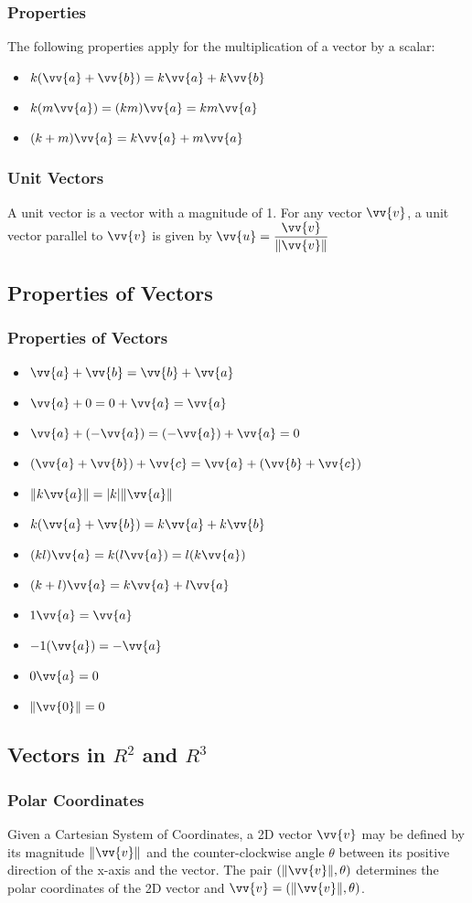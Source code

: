 \documentclass{article}
\newcommand{\mv}[1]{
	\lVert\vv{#1}\rVert
}
\begin{document}
	\subsubsection{Properties}
	The following properties apply for the multiplication of a vector by a scalar:
	\begin{itemize}
		\item $k(\vv{a}+\vv{b})=k\vv{a}+k\vv{b}$
		\item $k(m\vv{a})=(km)\vv{a}=km\vv{a}$
		\item $(k+m)\vv{a}=k\vv{a}+m\vv{a}$
	\end{itemize}
	\subsubsection{Unit Vectors}
	A unit vector is a vector with a magnitude of 1. For any vector $\vv{v}$, a unit vector parallel to $\vv{v}$ is given by $\vv{u}=\dfrac{\vv{v}}{\mv{v}}$
	\subsection{Properties of Vectors}
	\subsubsection{Properties of Vectors}
	\begin{itemize}
		\item $\vv{a}+\vv{b}=\vv{b}+\vv{a}$
		\item $\vv{a}+0=0+\vv{a}=\vv{a}$
		\item $\vv{a}+(-\vv{a})=(-\vv{a})+\vv{a}=0$
		\item $(\vv{a}+\vv{b})+\vv{c}=\vv{a}+(\vv{b}+\vv{c})$
		\item $\lVert k\vv{a}\rVert=|k|\mv{a}$
		\item $k(\vv{a}+\vv{b})=k\vv{a}+k\vv{b}$
		\item $(kl)\vv{a}=k(l\vv{a})=l(k\vv{a})$
		\item $(k+l)\vv{a}=k\vv{a}+l\vv{a}$
		\item $1\vv{a}=\vv{a}$
		\item $-1(\vv{a})=-\vv{a}$
		\item $0\vv{a}=0$
		\item $\mv{0}=0$
	\end{itemize}
	\subsection{Vectors in $R^2$ and $R^3$}
	\subsubsection{Polar Coordinates}
	Given a Cartesian System of Coordinates, a 2D vector $\vv{v}$ may be defined by its magnitude $\mv{v}$ and the counter-clockwise angle $\theta$ between its positive direction of the x-axis and the vector.
	The pair $(\lVert\vv{v}\rVert, \theta)$ determines the polar coordinates of the 2D vector and $\vv{v}=(\lVert\vv{v}\rVert, \theta)$.
\end{document}
